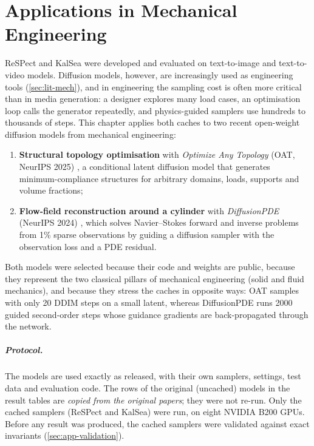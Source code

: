 \chapter{Applications in Mechanical Engineering}\label{ch:applications}

ReSPect and KalSea were developed and evaluated on text-to-image and text-to-video models. Diffusion models, however, are increasingly used as engineering tools (\cref{sec:lit-mech}), and in engineering the sampling cost is often more critical than in media generation: a designer explores many load cases, an optimisation loop calls the generator repeatedly, and physics-guided samplers use hundreds to thousands of steps. This chapter applies both caches to two recent open-weight diffusion models from mechanical engineering:
\begin{enumerate}
  \item \textbf{Structural topology optimisation} with \emph{Optimize Any Topology} (OAT, NeurIPS 2025) \citep{nobari2025oat}, a conditional latent diffusion model that generates minimum-compliance structures for arbitrary domains, loads, supports and volume fractions;
  \item \textbf{Flow-field reconstruction around a cylinder} with \emph{DiffusionPDE} (NeurIPS 2024) \citep{huang2024diffusionpde}, which solves Navier--Stokes forward and inverse problems from 1\% sparse observations by guiding a diffusion sampler with the observation loss and a PDE residual.
\end{enumerate}
Both models were selected because their code and weights are public, because they represent the two classical pillars of mechanical engineering (solid and fluid mechanics), and because they stress the caches in opposite ways: OAT samples with only 20 DDIM steps on a small latent, whereas DiffusionPDE runs 2000 guided second-order steps whose guidance gradients are back-propagated through the network.

\paragraph{Protocol.} The models are used exactly as released, with their own samplers, settings, test data and evaluation code. The rows of the original (uncached) models in the result tables are \emph{copied from the original papers}; they were not re-run. Only the cached samplers (ReSPect and KalSea) were run, on eight NVIDIA B200 GPUs. Before any result was produced, the cached samplers were validated against exact invariants (\cref{sec:app-validation}).

